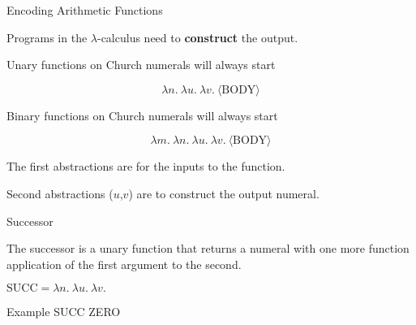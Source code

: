 \documentclass{beamer}
\begin{document}
\begin{frame}{Encoding Arithmetic Functions}

  
  
  
  
  Programs in the $\lambda$-calculus need to {\bf construct} the output.
  
  \vspace{0.3cm}
  
  Unary functions on Church numerals will always start 
  
  $$\lambda n. \ \lambda u. \ \lambda v. \ \langle \text{BODY} \rangle$$
  
  Binary functions on Church numerals will always start 
  
  $$\lambda m. \ \lambda n. \ \lambda u. \ \lambda v. \ \langle \text{BODY} \rangle $$
  
  \vspace{0.3cm}
  
  The first abstractions are for the inputs to the function. 
  
  \vspace{0.3cm}
  
  Second abstractions ($u$,$v$) are to construct the output numeral. 

\end{frame}


\begin{frame}{Successor}

  The successor is a unary function that returns a numeral with one more function application of the first argument to the second.
  
  \vspace{0.3cm}
  
  $\text{SUCC} = \lambda n. \ \lambda u. \ \lambda v. \ $
  
  \vspace{6cm}
      
\end{frame}

\begin{frame}{Example}
  SUCC ZERO
  
  \vspace{7cm}  
\end{frame}
\end{document}
